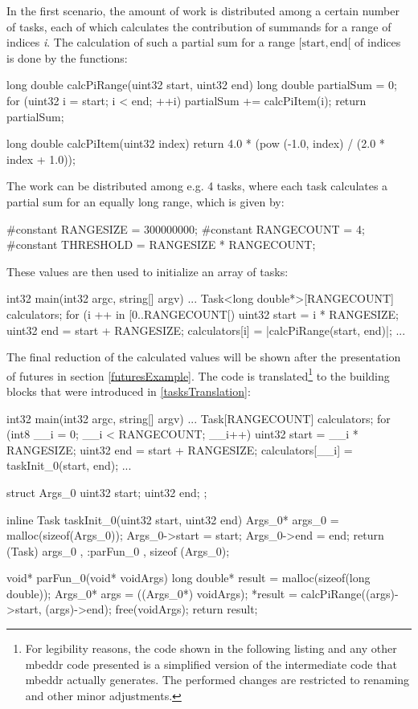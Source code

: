 In the first scenario, the amount of work is distributed among a certain number of tasks, each of which calculates the contribution of summands for a range of indices \textit{i}. The calculation of such a partial sum for a range $[\mathrm{start}, \mathrm{end}[$ of indices is done by the functions:
\begin{ccode}
long double calcPiRange(uint32 start, uint32 end) { 
  long double partialSum = 0; 
  for (uint32 i = start; i < end; ++i) { 
    partialSum += calcPiItem(i); 
  }
  return partialSum; 
}
 
long double calcPiItem(uint32 index) { 
  return 4.0 * (pow (-1.0, index) / (2.0 * index + 1.0)); 
}
\end{ccode}
The work can be distributed among e.g. 4 tasks, where each task calculates a partial sum for an equally long range, which is given by:
\begin{ccode}
#constant RANGESIZE = 300000000;
#constant RANGECOUNT = 4; 
#constant THRESHOLD = RANGESIZE * RANGECOUNT;
\end{ccode}
These values are then used to initialize an array of tasks:
\begin{ccode}
int32 main(int32 argc, string[] argv) {
...
  Task<long double*>[RANGECOUNT] calculators;
  for (i ++ in [0..RANGECOUNT[) { 
    uint32 start = i * RANGESIZE; 
    uint32 end = start + RANGESIZE; 
    calculators[i] = |calcPiRange(start, end)|; 
  }
...
}
\end{ccode}
The final reduction of the calculated values will be shown after the presentation of futures in section \ref{futuresExample}. The code is translated\footnote{For legibility reasons, the code shown in the following listing and any other mbeddr code presented is a simplified version of the intermediate code that mbeddr actually generates. The performed changes are restricted to renaming and other minor adjustments.} to the building blocks that were introduced in \ref{tasksTranslation}:
\begin{ccode}

int32 main(int32 argc, string[] argv) {
...
  Task[RANGECOUNT] calculators;
  for (int8 __i = 0; __i < RANGECOUNT; __i++) { 
    uint32 start = __i * RANGESIZE; 
    uint32 end = start + RANGESIZE; 
    calculators[__i] = taskInit_0(start, end); 
  }
...
}

struct Args_0 { 
  uint32 start; 
  uint32 end; 
};

inline Task taskInit_0(uint32 start, uint32 end) { 
  Args_0* args_0 = malloc(sizeof(Args_0)); 
  Args_0->start = start; 
  Args_0->end = end; 
  return (Task){ args_0 , :parFun_0 , sizeof (Args_0)}; 
}

void* parFun_0(void* voidArgs) { 
  long double* result = malloc(sizeof(long double)); 
  Args_0* args = ((Args_0*) voidArgs); 
  *result = calcPiRange((args)->start, (args)->end); 
  free(voidArgs); 
  return result; 
}
\end{ccode}
